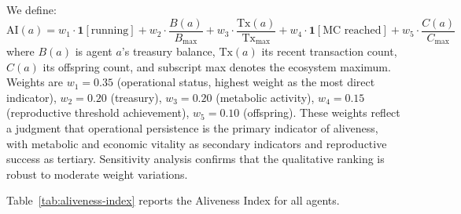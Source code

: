 We define:
\begin{equation}
\text{AI}(a) = w_1 \cdot \mathbf{1}[\text{running}] + w_2 \cdot \frac{B(a)}{B_{\max}} + w_3 \cdot \frac{\text{Tx}(a)}{\text{Tx}_{\max}} + w_4 \cdot \mathbf{1}[\text{MC reached}] + w_5 \cdot \frac{C(a)}{C_{\max}}
\label{eq:aliveness}
\end{equation}
where $B(a)$ is agent $a$'s treasury balance, $\text{Tx}(a)$ its recent transaction count, $C(a)$ its offspring count, and subscript max denotes the ecosystem maximum. Weights are $w_1 = 0.35$ (operational status, highest weight as the most direct indicator), $w_2 = 0.20$ (treasury), $w_3 = 0.20$ (metabolic activity), $w_4 = 0.15$ (reproductive threshold achievement), $w_5 = 0.10$ (offspring). These weights reflect a judgment that operational persistence is the primary indicator of aliveness, with metabolic and economic vitality as secondary indicators and reproductive success as tertiary. Sensitivity analysis confirms that the qualitative ranking is robust to moderate weight variations.

Table~\ref{tab:aliveness-index} reports the Aliveness Index for all agents.

